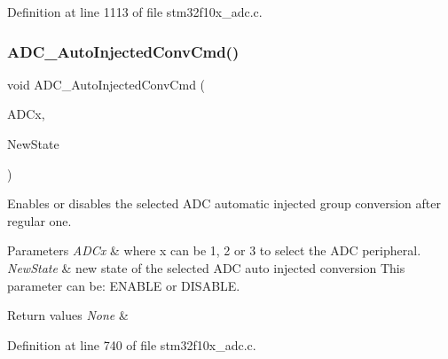 Definition at line 1113 of file stm32f10x\+\_\+adc.\+c.

\mbox{\label{group___a_d_c___private___functions_ga1ff9c3b8e4bbdd2addfd227f1a506a66}} 
\subsubsection{\texorpdfstring{A\+D\+C\+\_\+\+Auto\+Injected\+Conv\+Cmd()}{ADC\_AutoInjectedConvCmd()}}
{\footnotesize\ttfamily void A\+D\+C\+\_\+\+Auto\+Injected\+Conv\+Cmd (\begin{DoxyParamCaption}\item[{\hyperlink{struct_a_d_c___type_def}{A\+D\+C\+\_\+\+Type\+Def} $\ast$}]{A\+D\+Cx,  }\item[{\hyperlink{group___exported__types_gac9a7e9a35d2513ec15c3b537aaa4fba1}{Functional\+State}}]{New\+State }\end{DoxyParamCaption})}



Enables or disables the selected A\+DC automatic injected group conversion after regular one. 


\begin{DoxyParams}{Parameters}
{\em A\+D\+Cx} & where x can be 1, 2 or 3 to select the A\+DC peripheral. \\
\hline
{\em New\+State} & new state of the selected A\+DC auto injected conversion This parameter can be\+: E\+N\+A\+B\+LE or D\+I\+S\+A\+B\+LE. \\
\hline
\end{DoxyParams}

\begin{DoxyRetVals}{Return values}
{\em None} & \\
\hline
\end{DoxyRetVals}


Definition at line 740 of file stm32f10x\+\_\+adc.\+c.

\mbox{\label{group___a_d_c___private___functions_gaf34f36798f811b4a41321ea2d12118d4}} 
